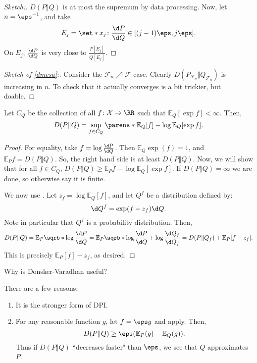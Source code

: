 \begin{proof}
	[Sketch:]
	$D(P\Vert Q)$ is at most the supremum by data processing. Now, let $n = \eps^{-1}$, and take \[
		E_j = \set*{x_j \colon \frac{\d P}{\d Q} \in [(j-1)\eps,j\eps]}.
	\] On $E_j$, $\frac{\d P}{\d Q}$ is very close to $\frac{P[E_j]}{Q[E_j]}$. 
\end{proof}

\begin{proof}
	[Sketch of \ref{dmcsa}:]
	Consider the $\mathcal F_n \nearrow \mathcal F$ case. Clearly $D(P_{\mathcal F_n}\Vert Q_{\mathcal F_n})$ is increasing in $n$. To check that it actually converges is a bit trickier, but doable.
\end{proof}

\begin{thm}
	Let $C_Q$ be the collection of all $f\colon \mathcal X\to \RR$ such that $\mathbb E_Q[\exp f] <\infty$. Then, \[
		D(P\Vert Q) = \sup_{f\in C_Q} \parens*{\mathbb E_Q[f] - \log \mathbb E_Q[\exp f]}.
	\]
\end{thm}

\begin{proof}
	For equality, take $f = \log \frac{\d P}{\d Q}$. Then $\mathbb E_Q \exp(f) = 1$, and $\mathbb E_P f = D(P\Vert Q)$. So, the right hand side is at least $D(P\Vert Q)$. 
	Now, we will show that for all $f\in C_Q$, $D(P\Vert Q) \geq \mathbb E_Pf - \log \mathbb E_Q [\exp f]$. 
	If $D(P\Vert Q) = \infty$ we are done, so otherwise say it is finite.

	We now use . Let $z_f = \log \mathbb E_Q[f]$, and let $Q^f$ be a distribution defined by: \[
		\d Q^f = \exp(f-z_f)\d Q.
	\]
	Note in particular that $Q^f$ is a probability distribution.
	Then, \[
		D(P\Vert Q) = \mathbb E_P \sqrb*{\log \frac{\d P}{\d Q}} = \mathbb E_P \sqrb*{\log \frac{\d P}{\d Q} + \log \frac{\d Q_f}{\d Q_f}} = D(P\Vert Q_f) + \mathbb E_P[f-z_f].
	\]
	This is precisely $\mathbb E_P[f] - z_f$, as desired.
\end{proof}

\begin{que}
	Why is Donsker-Varadhan useful?
\end{que}

There are a few reasons:

\begin{enumerate}
	\item It is the stronger form of DPI.
	\item For any reasonable function $g$, let $f = \eps g$ and apply. Then, \[
			D(P\Vert Q) \geq \eps (\mathbb E_P(g) - \mathbb E_Q(g)).
		\]
		Thus if $D(P\Vert Q)$ ``decreases faster" than $\eps$, we see that $Q$ approximates $P$.
\end{enumerate}

